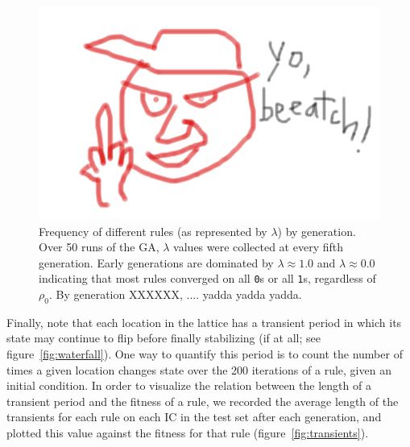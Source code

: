 \begin{figure}
\begin{center}
\includegraphics[width=\linewidth]{foo.png}
\caption{Frequency of different rules (as represented by $\lambda$) by generation. Over 50 runs of the GA, $\lambda$ values were collected at every 
fifth generation. Early generations are dominated by $\lambda \approx 1.0$ and $\lambda \approx 0.0$ indicating that most rules converged on all 
\texttt{0}s or all \texttt{1}s, regardless of $\rho_0$. By generation XXXXXX, .... yadda yadda yadda.}
\label{fig:histogram}
\end{center}
\end{figure}

Finally, note that each location in the lattice has a transient period in which its state may continue to flip before finally stabilizing (if at all; see figure~\ref{fig:waterfall}). One way to quantify this period is to count the number of times a given location changes state 
over the 200 iterations of a rule, given an initial condition. In order to visualize the relation between the length of a transient period and the fitness of a rule, 
we recorded the average length of the transients for each rule on each IC in the test set after each generation, and plotted this value against the fitness 
for that rule (figure~\ref{fig:transients}).


